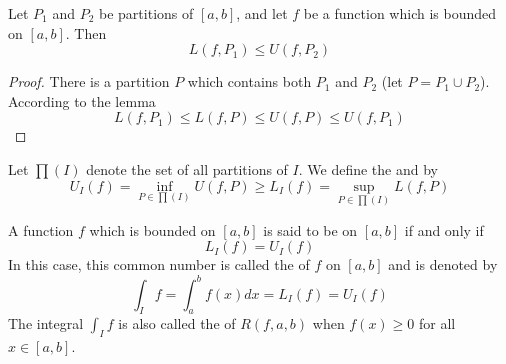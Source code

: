 \begin{theorem}
    Let $P_1$ and $P_2$ be partitions of $[a,b]$, and let $f$ be a function which is bounded on $[a,b]$. Then \begin{equation}
        L(f,P_1) \leq U(f,P_2)
    \end{equation}
\end{theorem}
\begin{proof}
    There is a partition $P$ which contains both $P_1$ and $P_2$ (let $P = P_1 \cup P_2$). According to the lemma \begin{equation*}
        L(f,P_1) \leq L(f,P) \leq U(f,P) \leq U(f,P_1)
    \end{equation*}
\end{proof}

\begin{definition}
    Let $\prod(I)$ denote the set of all partitions of $I$. We define the  and  by $$U_{I}(f) = \inf_{P\in \prod(I)}U(f,P) \geq L_I(f) = \sup_{P\in \prod(I)}L(f,P)$$
\end{definition}



\begin{definition}
    A function $f$ which is bounded on $[a,b]$ is said to be  on $[a,b]$ if and only if $$L_I(f) = U_I(f)$$ In this case, this common number is called the  of $f$ on $[a,b]$ and is denoted by \begin{equation}                            
        \int_If = \int_a^bf(x)dx = L_I(f) = U_I(f)
    \end{equation}
    The integral $\int_If$ is also called the  of $R(f,a,b)$ when $f(x) \geq 0$ for all $x \in [a,b]$.
\end{definition}


